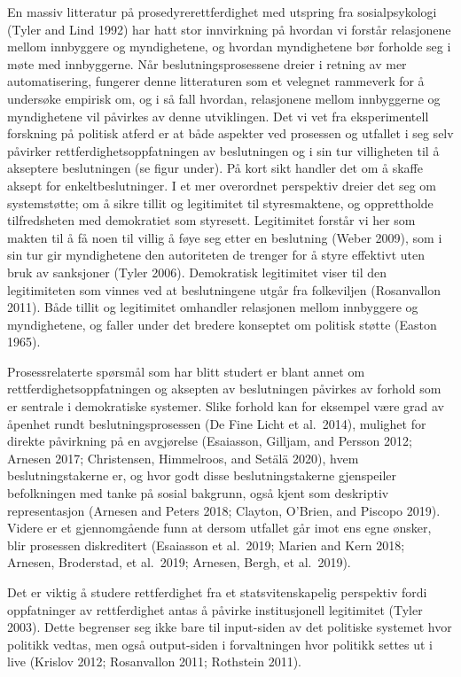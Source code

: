 \documentclass[
]{book}
\begin{document}
En massiv litteratur på prosedyrerettferdighet med utspring fra sosialpsykologi (Tyler and Lind 1992) har hatt stor innvirkning på hvordan vi forstår relasjonene mellom innbyggere og myndighetene, og hvordan myndighetene bør forholde seg i møte med innbyggerne.
Når beslutningsprosessene dreier i retning av mer automatisering, fungerer denne litteraturen som et velegnet rammeverk for å undersøke empirisk om, og i så fall hvordan, relasjonene mellom innbyggerne og myndighetene vil påvirkes av denne utviklingen.
Det vi vet fra eksperimentell forskning på politisk atferd er at både aspekter ved prosessen og utfallet i seg selv påvirker rettferdighetsoppfatningen av beslutningen og i sin tur villigheten til å akseptere beslutningen (se figur under).
På kort sikt handler det om å skaffe aksept for enkeltbeslutninger.
I et mer overordnet perspektiv dreier det seg om systemstøtte; om å sikre tillit og legitimitet til styresmaktene, og opprettholde tilfredsheten med demokratiet som styresett.
Legitimitet forstår vi her som makten til å få noen til villig å føye seg etter en beslutning (Weber 2009), som i sin tur gir myndighetene den autoriteten de trenger for å styre effektivt uten bruk av sanksjoner (Tyler 2006).
Demokratisk legitimitet viser til den legitimiteten som vinnes ved at beslutningene utgår fra folkeviljen (Rosanvallon 2011).
Både tillit og legitimitet omhandler relasjonen mellom innbyggere og myndighetene, og faller under det bredere konseptet om politisk støtte (Easton 1965).

Prosessrelaterte spørsmål som har blitt studert er blant annet om rettferdighetsoppfatningen og aksepten av beslutningen påvirkes av forhold som er sentrale i demokratiske systemer.
Slike forhold kan for eksempel være grad av åpenhet rundt beslutningsprosessen (De Fine Licht et al.~2014), mulighet for direkte påvirkning på en avgjørelse (Esaiasson, Gilljam, and Persson 2012; Arnesen 2017; Christensen, Himmelroos, and Setälä 2020), hvem beslutningstakerne er, og hvor godt disse beslutningstakerne gjenspeiler befolkningen med tanke på sosial bakgrunn, også kjent som deskriptiv representasjon (Arnesen and Peters 2018; Clayton, O'Brien, and Piscopo 2019). Videre er et gjennomgående funn at dersom utfallet går imot ens egne ønsker, blir prosessen diskreditert (Esaiasson et al.~2019; Marien and Kern 2018; Arnesen, Broderstad, et al.~2019; Arnesen, Bergh, et al.~2019).

Det er viktig å studere rettferdighet fra et statsvitenskapelig perspektiv fordi oppfatninger av rettferdighet antas å påvirke institusjonell legitimitet (Tyler 2003). Dette begrenser seg ikke bare til input-siden av det politiske systemet hvor politikk vedtas, men også output-siden i forvaltningen hvor politikk settes ut i live (Krislov 2012; Rosanvallon 2011; Rothstein 2011).
\end{document}
